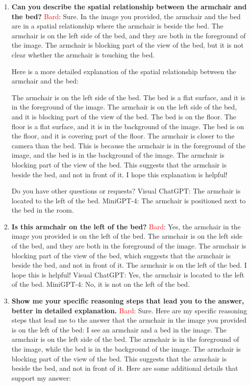 \begin{enumerate}
    \item \textbf{Can you describe the spatial relationship between the armchair and the bed?}
    \subitem \textcolor{Red}{Bard}: 
    Sure. In the image you provided, the armchair and the bed are in a spatial relationship where the armchair is beside the bed. The armchair is on the left side of the bed, and they are both in the foreground of the image. The armchair is blocking part of the view of the bed, but it is not clear whether the armchair is touching the bed.
    
    Here is a more detailed explanation of the spatial relationship between the armchair and the bed:
    
    The armchair is on the left side of the bed. The bed is a flat surface, and it is in the foreground of the image. The armchair is on the left side of the bed, and it is blocking part of the view of the bed.
    The bed is on the floor. The floor is a flat surface, and it is in the background of the image. The bed is on the floor, and it is covering part of the floor.
    The armchair is closer to the camera than the bed. This is because the armchair is in the foreground of the image, and the bed is in the background of the image.
    The armchair is blocking part of the view of the bed. This suggests that the armchair is beside the bed, and not in front of it.
    I hope this explanation is helpful!
    
    Do you have other questions or requests?
    \subitem Visual ChatGPT: The armchair is located to the left of the bed.
    \subitem MiniGPT-4: The armchair is positioned next to the bed in the room.
    \item \textbf{Is this armchair on the left of the bed?}
    \subitem \textcolor{Red}{Bard}: 
    Yes, the armchair in the image you provided is on the left of the bed. The armchair is on the left side of the bed, and they are both in the foreground of the image. The armchair is blocking part of the view of the bed, which suggests that the armchair is beside the bed, and not in front of it. The armchair is on the left of the bed.
    I hope this is helpful!
    \subitem Visual ChatGPT: Yes, the armchair is located to the left of the bed.
    \subitem MiniGPT-4: No, it is not on the left of the bed.
    \item \textbf{Show me your specific reasoning steps that lead you to the answer, better in detailed explanation.}
    \subitem \textcolor{Red}{Bard}: 
    Sure. Here are my specific reasoning steps that lead me to the answer that the armchair in the image you provided is on the left of the bed:
    I see an armchair and a bed in the image.
    The armchair is on the left side of the bed.
    The armchair is in the foreground of the image, while the bed is in the background of the image.
    The armchair is blocking part of the view of the bed. This suggests that the armchair is beside the bed, and not in front of it.
    Here are some additional details that support my answer:


\end{enumerate}
